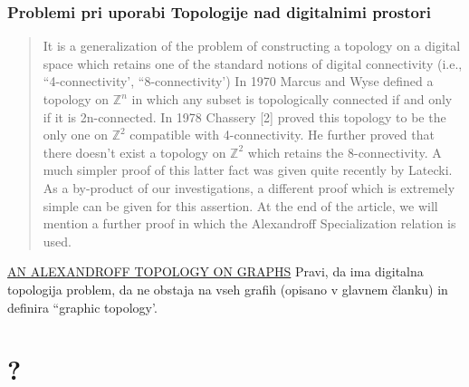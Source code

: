 \documentclass[mat1]{fmfdelo}
\begin{document}
\subsubsection{Problemi pri uporabi Topologije nad digitalnimi prostori}
\begin{quote}
  It is a generalization of the problem of constructing a topology on a
  digital space which retains one of the standard notions of
  digital connectivity (i.e., ``4-connectivity', ``8-connectivity')
  In 1970 Marcus and Wyse deﬁned a topology on
  $\mathbb{Z}^n$ in which any subset is topologically connected if and
  only if it is 2n-connected. In 1978 Chassery [2] proved this
  topology to be the only one on $\mathbb{Z}^2$ compatible with 4-connectivity.
  He further proved that there doesn't exist a
  topology on $\mathbb{Z}^2$ which retains the 8-connectivity. A much
  simpler proof of this latter fact was given quite recently
  by Latecki. As a by-product of our investigations, a
  different proof which is extremely simple can be given for
  this assertion. At the end of the article, we will mention
  a further proof in which the Alexandroff Specialization
  relation is used.
\end{quote}





\href{http://bims.iranjournals.ir/article_266_e1ff26c6f7b350afcde8bd3ec3654132.pdf}{AN ALEXANDROFF TOPOLOGY ON GRAPHS}
Pravi, da ima digitalna\\ topologija problem, da ne obstaja na vseh grafih
(opisano v glavnem članku) in definira ``graphic topology'.
\section{?}
\end{document}
